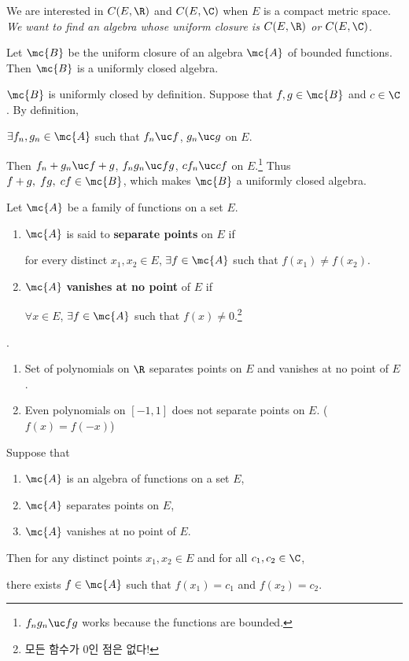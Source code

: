 \medskip

\question We are interested in \(C(E, \R)\) and \(C(E, \C)\) when \(E\) is a compact metric space. \textit{We want to find an algebra whose uniform closure is \(C(E, \R)\) or \(C(E, \C)\).}

 Let \(\mc{B}\) be the uniform closure of an algebra \(\mc{A}\) of bounded functions. Then \(\mc{B}\) is a uniformly closed algebra.

\pf \(\mc{B}\) is uniformly closed by definition. Suppose that \(f, g \in \mc{B}\) and \(c \in \C\). By definition,
\begin{center}
    \(\exists f_n, g_n \in \mc{A}\) such that \(f_n \uc f\), \(g_n \uc g\) on \(E\).
\end{center}
Then \(f_n + g_n \uc f+g\), \(f_n g_n \uc fg\), \(cf_n \uc cf\) on \(E\).\footnote{\(f_n g_n \uc fg\) works because the functions are bounded.} Thus \(f+g,\; fg,\; cf \in \mc{B}\), which makes \(\mc{B}\) a uniformly closed algebra.

 Let \(\mc{A}\) be a family of functions on a set \(E\).
\begin{enumerate}
    \item \(\mc{A}\) is said to \textbf{separate points} on \(E\) if
          \begin{center}
              for every distinct \(x_1, x_2 \in E\), \(\exists f\in \mc{A}\) such that \(f(x_1) \neq f(x_2)\).
          \end{center}
    \item \(\mc{A}\) \textbf{vanishes at no point} of \(E\) if
          \begin{center}
              \(\forall x \in E\), \(\exists f \in \mc{A}\) such that \(f(x) \neq 0\).\footnote{모든 함수가 0인 점은 없다!}
          \end{center}
\end{enumerate}

\ex.
\begin{enumerate}
    \item Set of polynomials on \(\R\) separates points on \(E\) and vanishes at no point of \(E\).
    \item Even polynomials on \([-1, 1]\) does not separate points on \(E\). (\(f(x) = f(-x)\))
\end{enumerate}

\medskip

 Suppose that
\begin{enumerate}
    \item \(\mc{A}\) is an algebra of functions on a set \(E\),
    \item \(\mc{A}\) separates points on \(E\),
    \item \(\mc{A}\) vanishes at no point of \(E\).
\end{enumerate}
Then for any distinct points \(x_1, x_2 \in E\) and for all \(c_1, c_2 \in \C\),
\begin{center}
    there exists \(f \in \mc{A}\) such that \(f(x_1) = c_1\) and \(f(x_2) = c_2\).
\end{center}

